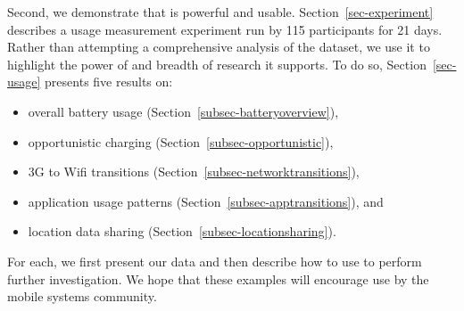 Second, we demonstrate that \PhoneLab{} is powerful and usable.
Section~\ref{sec-experiment} describes a usage measurement experiment run by
115 \PhoneLab{} participants for 21 days. Rather than attempting a
comprehensive analysis of the dataset, we use it to highlight the power of
\PhoneLab{} and breadth of research it supports. To do so,
Section~\ref{sec-usage} presents five results on:

\begin{itemize}[nosep]
\vspace*{0.08in}
\item overall battery usage (Section~\ref{subsec-batteryoverview}),
\item opportunistic charging (Section~\ref{subsec-opportunistic}),
\item 3G to Wifi transitions (Section~\ref{subsec-networktransitions}),
\item application usage patterns (Section~\ref{subsec-apptransitions}), and
\item location data sharing (Section~\ref{subsec-locationsharing}).
\vspace*{0.08in}
\end{itemize}

For each, we first present our data and then describe how to use \PhoneLab{}
to perform further investigation. We hope that these examples will encourage
\PhoneLab{} use by the mobile systems community.
